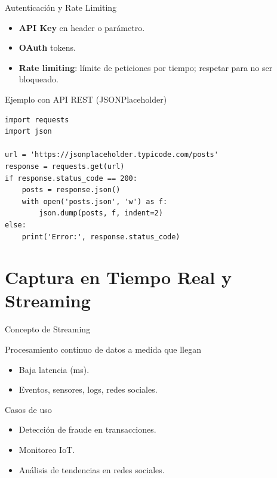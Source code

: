 \documentclass[aspectratio=169, 10pt, xcolor=table]{beamer}
\begin{document}
\begin{frame}[fragile]{Autenticación y Rate Limiting}
    \begin{itemize}
        \item \textbf{API Key} en header o parámetro.
        \item \textbf{OAuth} tokens.
        \item \textbf{Rate limiting}: límite de peticiones por tiempo; respetar para no ser bloqueado.
    \end{itemize}
    \begin{block}{Ejemplo con API REST (JSONPlaceholder)}
        \begin{lstlisting}[style=python]
import requests
import json

url = 'https://jsonplaceholder.typicode.com/posts'
response = requests.get(url)
if response.status_code == 200:
    posts = response.json()
    with open('posts.json', 'w') as f:
        json.dump(posts, f, indent=2)
else:
    print('Error:', response.status_code)
        \end{lstlisting}
    \end{block}
\end{frame}

\section{Captura en Tiempo Real y Streaming}

\begin{frame}{Concepto de Streaming}
    \begin{block}{Procesamiento continuo de datos a medida que llegan}
        \begin{itemize}
            \item Baja latencia (ms).
            \item Eventos, sensores, logs, redes sociales.
        \end{itemize}
    \end{block}
    \begin{exampleblock}{Casos de uso}
        \begin{itemize}
            \item Detección de fraude en transacciones.
            \item Monitoreo IoT.
            \item Análisis de tendencias en redes sociales.
        \end{itemize}
    \end{exampleblock}
\end{frame}
\end{document}
